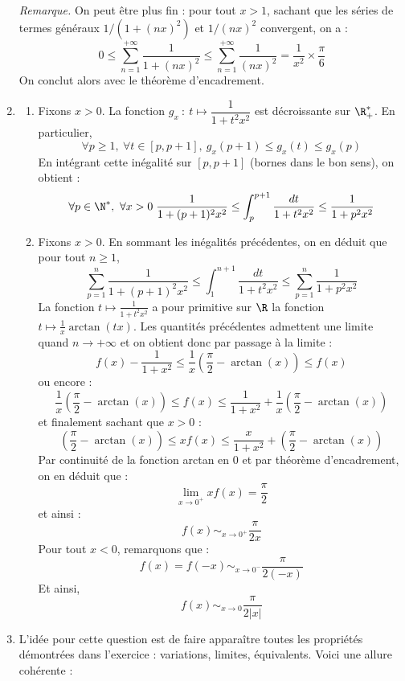 \documentclass[a4paper,twoside,french,11pt]{VcCours}
\begin{document}
\begin{enumerate}
\medskip

\textit{Remarque.} On peut être plus fin : pour tout $x>1$, sachant que les séries de termes généraux $1/(1+(nx)^2)$ et $1/(nx)^2$ convergent, on a :
$$ 0 \leq \sum_{n=1}^{+ \infty} \dfrac{1}{1+(nx)^2} \leq \sum_{n=1}^{+ \infty} \dfrac{1}{(nx)^2} = \frac{1}{x^2} \times \frac{\pi}{6}$$
On conclut alors avec le théorème d'encadrement.
\item
\begin{enumerate}
\item Fixons $x>0$. La fonction $g_x\ :\ t\mapsto \dfrac{1}{1+t^2x^2}$ est décroissante sur $\R_+^{*}$. En particulier,
\[\forall p\geq 1,\ \forall t\in [p,p+1],\ g_x(p+1)\leq g_x(t)\leq g_x(p)\]
En intégrant cette inégalité sur $[p,p+1]$ (bornes dans le bon sens), on obtient :
\[\forall p\in \N^*,\ \forall x>0 \; \frac{1}{1+(p+1)^2x^2}\leq \int_p^{p+1}\frac{dt}{1+t^2x^2}\leq \frac{1}{1+p^2x^2}\]
\item Fixons $x>0$. En sommant les inégalités précédentes, on en déduit que pour tout $n \geq 1$,
\[ \sum_{p=1}^n \frac{1}{1+(p+1)^2x^2}\leq \int_1^{n+1}\frac{dt}{1+t^2x^2}\leq \sum_{p=1}^n\frac{1}{1+p^2x^2}\]
La fonction $t\mapsto \frac{1}{1+t^2x^2}$ a pour primitive sur $\R$ la fonction $t\mapsto \frac{1}{x}\arctan(tx)$. Les quantités précédentes admettent une limite quand $n \rightarrow +\infty$ et on obtient donc par passage à la limite :
\[f(x)-\frac{1}{1+x^2}\leq \frac{1}{x} \left(\frac{\pi}{2} - \arctan(x) \right) \leq f(x)\]
ou encore :
\[ \frac{1}{x} \left(\frac{\pi}{2} - \arctan(x) \right)\leq f(x)\leq \frac{1}{1+x^2}+ \frac{1}{x} \left(\frac{\pi}{2} - \arctan(x) \right)\]
et finalement sachant que $x>0$ :
$$ \left(\frac{\pi}{2} - \arctan(x) \right) \leq x f(x) \leq \frac{x}{1+x^2}  +\left(\frac{\pi}{2} - \arctan(x) \right) $$
Par continuité de la fonction arctan en $0$ et par théorème d'encadrement, on en déduit que :
$$ \lim_{x \rightarrow 0^+} x f(x) = \frac{\pi}{2}$$
et ainsi :
\[f(x)\mathop{\sim}_{x\to 0^+} \frac{\pi}{2x}\]
Pour tout $x<0$, remarquons que :
\[f(x)=f(-x) \mathop{\sim}_{x\to 0^{-}} \frac{\pi}{2(-x)}\]
Et ainsi,
\[f(x)\mathop{\sim}_{x\to 0} \frac{\pi}{2 \vert x \vert }\]
\end{enumerate}
\item L'idée pour cette question est de faire apparaître toutes les propriétés démontrées dans l'exercice : variations, limites, équivalents. Voici une allure cohérente :


\end{enumerate}
\end{document}
